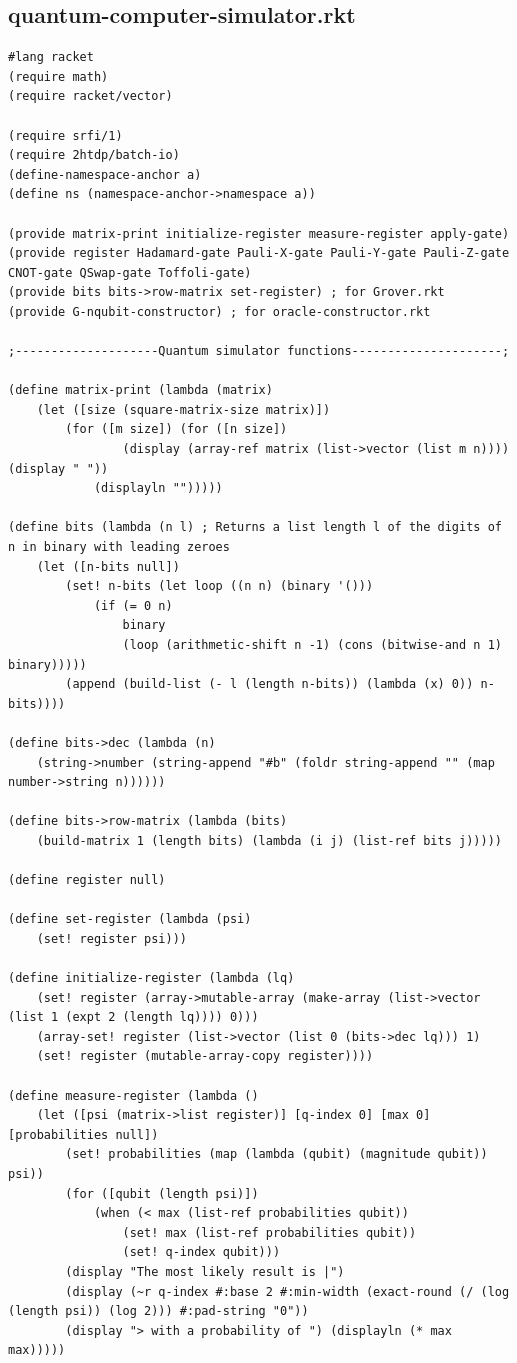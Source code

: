 \documentclass[11pt]{report}
\newcommand{\?}{\stackrel{?}{=}}
\begin{document}
\begin{appendix}
	\chapter{quantum-computer-simulator.rkt}
	\begin{lstlisting}
#lang racket
(require math)
(require racket/vector)

(require srfi/1)
(require 2htdp/batch-io)
(define-namespace-anchor a)
(define ns (namespace-anchor->namespace a))

(provide matrix-print initialize-register measure-register apply-gate)
(provide register Hadamard-gate Pauli-X-gate Pauli-Y-gate Pauli-Z-gate CNOT-gate QSwap-gate Toffoli-gate)
(provide bits bits->row-matrix set-register) ; for Grover.rkt
(provide G-nqubit-constructor) ; for oracle-constructor.rkt

;--------------------Quantum simulator functions---------------------;

(define matrix-print (lambda (matrix)
	(let ([size (square-matrix-size matrix)])
		(for ([m size]) (for ([n size])
				(display (array-ref matrix (list->vector (list m n)))) (display " "))
			(displayln "")))))

(define bits (lambda (n l) ; Returns a list length l of the digits of n in binary with leading zeroes
	(let ([n-bits null])
		(set! n-bits (let loop ((n n) (binary '()))
			(if (= 0 n) 
				binary
				(loop (arithmetic-shift n -1) (cons (bitwise-and n 1) binary)))))
		(append (build-list (- l (length n-bits)) (lambda (x) 0)) n-bits))))

(define bits->dec (lambda (n)
	(string->number (string-append "#b" (foldr string-append "" (map number->string n))))))

(define bits->row-matrix (lambda (bits)
	(build-matrix 1 (length bits) (lambda (i j) (list-ref bits j)))))

(define register null)

(define set-register (lambda (psi)
	(set! register psi)))

(define initialize-register (lambda (lq)
	(set! register (array->mutable-array (make-array (list->vector (list 1 (expt 2 (length lq)))) 0)))
	(array-set! register (list->vector (list 0 (bits->dec lq))) 1)
	(set! register (mutable-array-copy register))))

(define measure-register (lambda ()
	(let ([psi (matrix->list register)] [q-index 0] [max 0] [probabilities null])
		(set! probabilities (map (lambda (qubit) (magnitude qubit)) psi))
		(for ([qubit (length psi)])
			(when (< max (list-ref probabilities qubit))
				(set! max (list-ref probabilities qubit))
				(set! q-index qubit)))
		(display "The most likely result is |") 
		(display (~r q-index #:base 2 #:min-width (exact-round (/ (log (length psi)) (log 2))) #:pad-string "0"))
		(display "> with a probability of ") (displayln (* max max)))))


\end{lstlisting}
\end{appendix}
\end{document}
